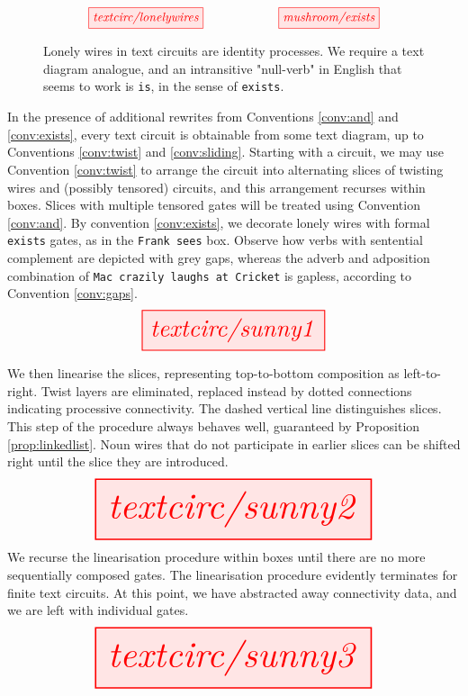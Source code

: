 \begin{figure}[h!]\label{fig:exists}
\centering
\[
\tikzfig{textcirc/lonelywires} 
\qquad\qquad\qquad
\tikzfig{mushroom/exists} 
\]
\caption{
Lonely wires in text circuits are identity processes. We require a text diagram analogue, and an intransitive "null-verb" in English that seems to work is \texttt{is}, in the sense of \texttt{exists}.
}
\end{figure}

\clearpage

\begin{myboxB}
\begin{construction}\label{cons:circ2text}
In the presence of additional rewrites from Conventions \ref{conv:and} and \ref{conv:exists}, every text circuit is obtainable from some text diagram, up to Conventions \ref{conv:twist} and \ref{conv:sliding}. Starting with a circuit, we may use Convention \ref{conv:twist} to arrange the circuit into alternating slices of twisting wires and (possibly tensored) circuits, and this arrangement recurses within boxes. Slices with multiple tensored gates will be treated using Convention \ref{conv:and}. By convention \ref{conv:exists}, we decorate lonely wires with formal \texttt{exists} gates, as in the \texttt{Frank sees} box. Observe how verbs with sentential complement are depicted with grey gaps, whereas the adverb and adposition combination of \texttt{Mac crazily laughs at Cricket} is gapless, according to Convention \ref{conv:gaps}.
\[
\resizebox{0.5\textwidth}{!}{\tikzfig{textcirc/sunny1}}
\]
\end{construction}
\end{myboxB}

\begin{myboxB}
We then linearise the slices, representing top-to-bottom composition as left-to-right. Twist layers are eliminated, replaced instead by dotted connections indicating processive connectivity. The dashed vertical line distinguishes slices. This step of the procedure always behaves well, guaranteed by Proposition \ref{prop:linkedlist}. Noun wires that do not participate in earlier slices can be shifted right until the slice they are introduced.
\[
\resizebox{0.75\textwidth}{!}{\tikzfig{textcirc/sunny2}}
\]
We recurse the linearisation procedure within boxes until there are no more sequentially composed gates. The linearisation procedure evidently terminates for finite text circuits. At this point, we have abstracted away connectivity data, and we are left with individual gates.
\[
\resizebox{0.75\textwidth}{!}{\tikzfig{textcirc/sunny3}}
\]

\end{myboxB}

